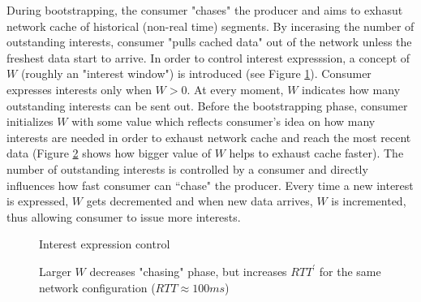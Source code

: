 \documentclass[10pt]{proc}
\begin{document}
During bootstrapping, the consumer "chases" the producer and aims to exhasut network cache of historical (non-real time) segments. By incerasing the number of outstanding interests, consumer "pulls cached data" out of the network unless the freshest data start to arrive. In order to control interest expresssion, a concept of $W$ (roughly an "interest window") is introduced (see Figure \ref{fig:w-concept}). Consumer expresses interests only when $W > 0$. At every moment, $W$ indicates how many outstanding interests can be sent out. Before the bootstrapping phase, consumer initializes $W$ with some value which reflects consumer's idea on how many interests are needed in order to exhaust network cache and reach the most recent data (Figure \ref{fig:ws} shows how bigger value of $W$ helps to exhaust cache faster). The number of outstanding interests is controlled by a consumer and directly influences how fast consumer can ``chase" the producer. Every time a new interest is expressed, $W$ gets decremented and when new data arrives, $W$ is incremented, thus allowing consumer to issue more interests.

\begin{figure}[t!]
\centering


\caption{Interest expression control}
\label{fig:w-concept}
\end{figure}

\begin{figure}[t!]
\centering
\begin{scriptsize}
\end{scriptsize}
\caption{Larger $W$ decreases "chasing" phase, but increases $RTT^\prime$ for the same network configuration ($RTT\approx100ms$)}
\label{fig:ws}
\end{figure}
\end{document}
